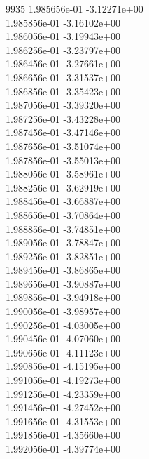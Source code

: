 9935	1.985656e-01	-3.12271e+00	\\ 	1.985856e-01	-3.16102e+00	\\ 	1.986056e-01	-3.19943e+00	\\ 	1.986256e-01	-3.23797e+00	\\ 	1.986456e-01	-3.27661e+00	\\ 	1.986656e-01	-3.31537e+00	\\ 	1.986856e-01	-3.35423e+00	\\ 	1.987056e-01	-3.39320e+00	\\ 	1.987256e-01	-3.43228e+00	\\ 	1.987456e-01	-3.47146e+00	\\ 	1.987656e-01	-3.51074e+00	\\ 	1.987856e-01	-3.55013e+00	\\ 	1.988056e-01	-3.58961e+00	\\ 	1.988256e-01	-3.62919e+00	\\ 	1.988456e-01	-3.66887e+00	\\ 	1.988656e-01	-3.70864e+00	\\ 	1.988856e-01	-3.74851e+00	\\ 	1.989056e-01	-3.78847e+00	\\ 	1.989256e-01	-3.82851e+00	\\ 	1.989456e-01	-3.86865e+00	\\ 	1.989656e-01	-3.90887e+00	\\ 	1.989856e-01	-3.94918e+00	\\ 	1.990056e-01	-3.98957e+00	\\ 	1.990256e-01	-4.03005e+00	\\ 	1.990456e-01	-4.07060e+00	\\ 	1.990656e-01	-4.11123e+00	\\ 	1.990856e-01	-4.15195e+00	\\ 	1.991056e-01	-4.19273e+00	\\ 	1.991256e-01	-4.23359e+00	\\ 	1.991456e-01	-4.27452e+00	\\ 	1.991656e-01	-4.31553e+00	\\ 	1.991856e-01	-4.35660e+00	\\ 	1.992056e-01	-4.39774e+00	\\ \hline
